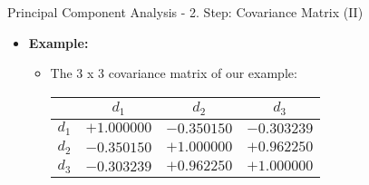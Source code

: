 \begin{frame}{Principal Component Analysis - 2. Step: Covariance Matrix (II)}
	\begin{itemize}
		\item \textbf{Example:}
		      \begin{itemize}
			      \item The 3 x 3 covariance matrix of our example: \\
			            \vspace{3mm}
			            \begin{center}
				            \centering
				            \begin{tabular}{|l|c|c|c|}
					            \hline
					                  & $d_1$       & $d_2$       & $d_3$
					            \\\hline
					            $d_1$ & $+1.000000$ & $-0.350150$ & $-0.303239$
					            \\\hline
					            $d_2$ & $-0.350150$ & $+1.000000$ & $+0.962250$
					            \\\hline
					            $d_3$ & $-0.303239$ & $+0.962250$ & $+1.000000$
					            \\\hline
				            \end{tabular}
			            \end{center}
		      \end{itemize}
	\end{itemize}
\end{frame}

